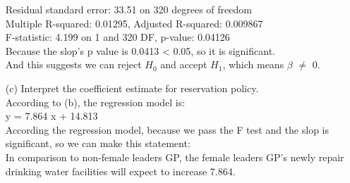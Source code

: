 \documentclass[12pt,letterpaper]{article}
\begin{document}
\begin{enumerate}
	Residual standard error: 33.51 on 320 degrees of freedom \\
	Multiple R-squared:  0.01295,	Adjusted R-squared:  0.009867 \\
	F-statistic: 4.199 on 1 and 320 DF,  p-value: 0.04126 \\
	
	Because the slop's p value is 0.0413 < 0.05, so it is significant.\\
	
	And this suggests we can reject $H_0$ and accept $H_1$, which means $\beta$ $\neq$ 0.

	
	\newpage
	\item [(c)] Interpret the coefficient estimate for reservation policy. \\
	
	According to (b), the regression model is: \\
	
	y = 7.864 x + 14.813 \\
	
	According the regression model, because we pass the F test and the slop is significant, so we can make this statement:\\
	
	In comparison to non-female leaders GP, the female leaders GP's newly repair drinking water facilities will expect to increase 7.864. \\
	
\end{enumerate}
\end{document}

